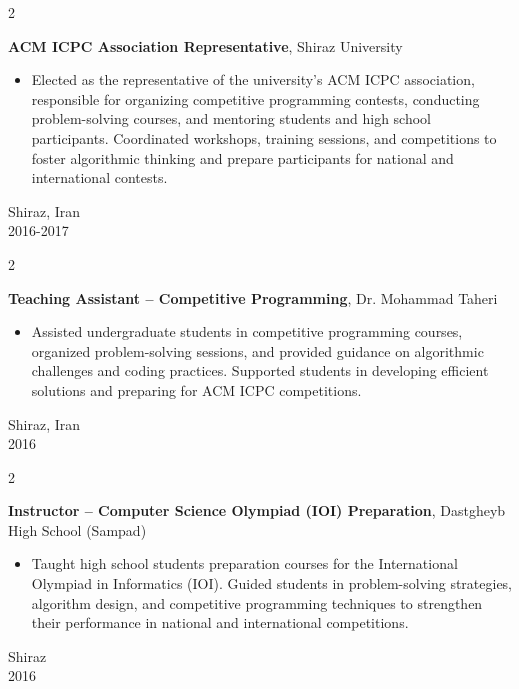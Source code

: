 \documentclass[10pt, letterpaper]{article}
\newenvironment{highlights}{
    \begin{itemize}[
        topsep=0.10 cm,
        parsep=0.10 cm,
        partopsep=0pt,
        itemsep=0pt,
        leftmargin=0.4 cm + 10pt
    ]
}{
    \end{itemize}
}
\newenvironment{twocolentry}[2][]{
    \onecolentry
    \def\secondColumn{#2}
    \setcolumnwidth{\fill, 4.5 cm}
    \begin{paracol}{2}
}{
    \switchcolumn \raggedleft \secondColumn
    \end{paracol}
    \endonecolentry
}
\begin{document}
    \begin{twocolentry}{Shiraz, Iran \\ 2016-2017}
        \textbf{ACM ICPC Association Representative}, Shiraz University
    \begin{highlights}
    \item Elected as the representative of the university's ACM ICPC association, responsible for organizing competitive programming contests, conducting problem-solving courses, and mentoring students and high school participants. Coordinated workshops, training sessions, and competitions to foster algorithmic thinking and prepare participants for national and international contests.
    \end{highlights}
    \end{twocolentry}

    \begin{twocolentry}{Shiraz, Iran \\ 2016}
        \textbf{Teaching Assistant -- Competitive Programming}, Dr. Mohammad Taheri
        \begin{highlights}
            \item Assisted undergraduate students in competitive programming courses, organized problem-solving sessions, and provided guidance on algorithmic challenges and coding practices. Supported students in developing efficient solutions and preparing for ACM ICPC competitions.
        \end{highlights}
    \end{twocolentry}

    \begin{twocolentry}{Shiraz \\ 2016}
        \textbf{Instructor -- Computer Science Olympiad (IOI) Preparation}, Dastgheyb High School (Sampad)
        \begin{highlights}
            \item Taught high school students preparation courses for the International Olympiad in Informatics (IOI). Guided students in problem-solving strategies, algorithm design, and competitive programming techniques to strengthen their performance in national and international competitions.
        \end{highlights}
    \end{twocolentry}
\end{document}
